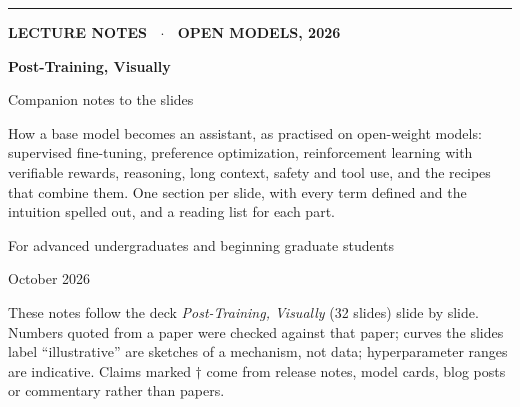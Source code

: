 \documentclass[11pt,letterpaper]{article}
\begin{document}
\begin{titlepage}
\thispagestyle{empty}
\vspace*{2.5cm}
{\color{attn}\rule{3cm}{3pt}}\par\vspace{0.6cm}
{\sffamily\bfseries\color{muted}\large LECTURE NOTES \ $\cdot$ \ OPEN MODELS, 2026\par}
\vspace{0.4cm}
{\sffamily\bfseries\fontsize{34}{38}\selectfont\color{ink} Post-Training, Visually\par}
\vspace{0.3cm}
{\sffamily\fontsize{18}{22}\selectfont\color{ink} Companion notes to the slides\par}
\vspace{1.2cm}
{\large\color{muted}\parbox{0.82\textwidth}{How a base model becomes an assistant, as practised on open-weight models: supervised fine-tuning, preference optimization, reinforcement learning with verifiable rewards, reasoning, long context, safety and tool use, and the recipes that combine them. One section per slide, with every term defined and the intuition spelled out, and a reading list for each part.}\par}
\vspace{1.5cm}
{\color{muted}For advanced undergraduates and beginning graduate students\par}
\vspace{0.3cm}
{\color{muted}October 2026\par}
\vfill
{\small\color{muted}\parbox{0.9\textwidth}{These notes follow the deck \textit{Post-Training, Visually} (32 slides) slide by slide. Numbers quoted from a paper were checked against that paper; curves the slides label ``illustrative'' are sketches of a mechanism, not data; hyperparameter ranges are indicative. Claims marked $\dagger$ come from release notes, model cards, blog posts or commentary rather than papers.}\par}
\end{titlepage}

\tableofcontents
\clearpage
\end{document}
